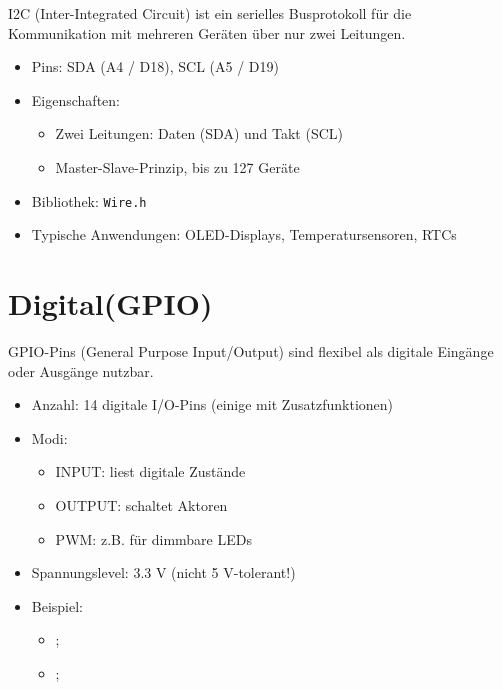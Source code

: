 I2C (Inter-Integrated Circuit) ist ein serielles Busprotokoll für die Kommunikation mit mehreren Geräten über nur zwei Leitungen. \cite{ArduinoWire:2025}

\begin{itemize}
    \item Pins: SDA (A4 / D18), SCL (A5 / D19)
    
    \item Eigenschaften:
    \begin{itemize}
        \item Zwei Leitungen: Daten (SDA) und Takt (SCL)
        
        \item Master-Slave-Prinzip, bis zu 127 Geräte
    \end{itemize}
    
    \item Bibliothek: \texttt{Wire.h}
    
    \item Typische Anwendungen: OLED-Displays, Temperatursensoren, RTCs
    
\end{itemize}



\section{Digital(GPIO)}

GPIO-Pins (General Purpose Input/Output) sind flexibel als digitale Eingänge oder Ausgänge nutzbar. \cite{ArduinoDigitalPins:2025} \cite{Arduino:2025NanoBLE}

\begin{itemize}
    \item Anzahl: 14 digitale I/O-Pins (einige mit Zusatzfunktionen)
    
    \item Modi:
    \begin{itemize}
        \item INPUT: liest digitale Zustände
        
        \item OUTPUT: schaltet Aktoren
        
        \item PWM: z.B. für dimmbare LEDs
        
    \end{itemize}
    
    \item Spannungslevel: 3.3 V (nicht 5 V-tolerant!)
    
    \item Beispiel:
    \begin{itemize}
        \item {};
        
        \item {};
    \end{itemize}
    
\end{itemize}

